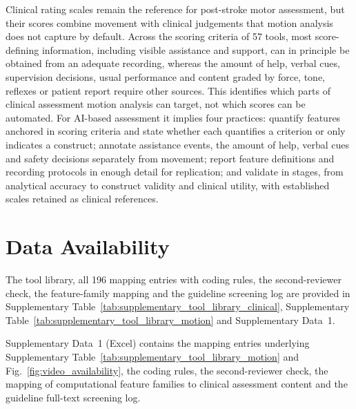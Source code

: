 \documentclass[11pt]{article}
\begin{document}
Clinical rating scales remain the reference for post-stroke motor assessment, but their scores combine movement with clinical judgements that motion analysis does not capture by default. Across the scoring criteria of 57 tools, most score-defining information, including visible assistance and support, can in principle be obtained from an adequate recording, whereas the amount of help, verbal cues, supervision decisions, usual performance and content graded by force, tone, reflexes or patient report require other sources. This identifies which parts of clinical assessment motion analysis can target, not which scores can be automated. For AI-based assessment it implies four practices: quantify features anchored in scoring criteria and state whether each quantifies a criterion or only indicates a construct; annotate assistance events, the amount of help, verbal cues and safety decisions separately from movement; report feature definitions and recording protocols in enough detail for replication; and validate in stages, from analytical accuracy to construct validity and clinical utility, with established scales retained as clinical references.

\section*{Data Availability}
The tool library, all 196 mapping entries with coding rules, the second-reviewer check, the feature-family mapping and the guideline screening log are provided in Supplementary Table~\ref{tab:supplementary_tool_library_clinical}, Supplementary Table~\ref{tab:supplementary_tool_library_motion} and Supplementary Data~1.

\printbibliography




\noindent Supplementary Data~1 (Excel) contains the mapping entries underlying Supplementary Table~\ref{tab:supplementary_tool_library_motion} and Fig.~\ref{fig:video_availability}, the coding rules, the second-reviewer check, the mapping of computational feature families to clinical assessment content and the guideline full-text screening log.
\end{document}
